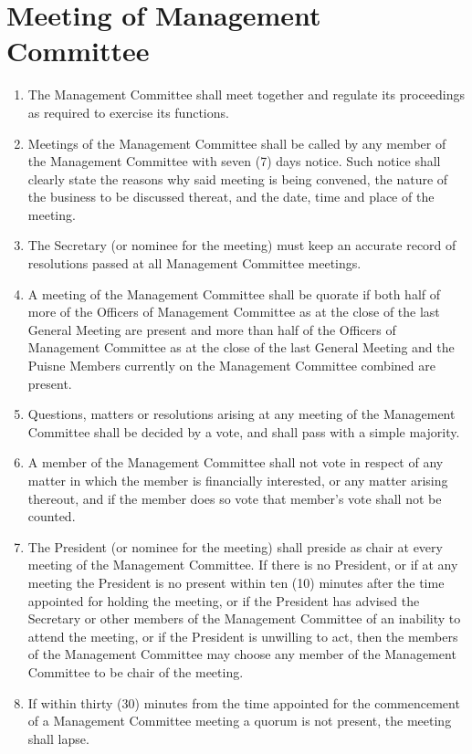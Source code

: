 \documentclass[a4paper]{article}
\newcommand*{\sectionr}[1]{{\raggedright \section{#1}}}
\begin{document}
\sectionr{Meeting of Management Committee}
\begin{enumerate}
\item The Management Committee shall meet together and regulate its proceedings as required to exercise its functions.
\item Meetings of the Management Committee shall be called by any member of the Management Committee with seven (7) days notice. Such notice shall clearly state the reasons why said meeting is being convened, the nature of the business to be discussed thereat, and the date, time and place of the meeting.
\item The Secretary (or nominee for the meeting) must keep an accurate record of resolutions passed at all Management Committee meetings.
\item A meeting of the Management Committee shall be quorate if both half of more of the Officers of Management Committee as at the close of the last General Meeting are present and more than half of the Officers of Management Committee as at the close of the last General Meeting and the Puisne Members currently on the Management Committee combined are present.
\item Questions, matters or resolutions arising at any meeting of the Management Committee shall be decided by a vote, and shall pass with a simple majority.
\item A member of the Management Committee shall not vote in respect of any matter in which the member is financially interested, or any matter arising thereout, and if the member does so vote that member's vote shall not be counted.
\item The President (or nominee for the meeting) shall preside as chair at every meeting of the Management Committee. If there is no President, or if at any meeting the President is no present within ten (10) minutes after the time appointed for holding the meeting, or if the President has advised the Secretary or other members of the Management Committee of an inability to attend the meeting, or if the President is unwilling to act, then the members of the Management Committee may choose any member of the Management Committee to be chair of the meeting.
\item If within thirty (30) minutes from the time appointed for the commencement of a Management Committee meeting a quorum is not present, the meeting shall lapse.
\end{enumerate}
\end{document}
